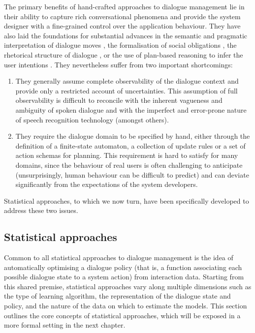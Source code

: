 The primary benefits of hand-crafted approaches to dialogue management lie in their ability to capture rich conversational phenomena and provide the system designer with a fine-grained control over the application behaviour.  They have also laid the foundations for substantial advances in the semantic and pragmatic interpretation of dialogue moves \citep{ThomasonManuscript-THOEUA,Ginzburg2012}, the formalisation of social obligations \citep{Traum:1994}, the rhetorical structure of dialogue \citep{0521659515}, or the use of plan-based reasoning to infer the user intentions \citep{Allen1980,Litman87}.  They nevertheless suffer from two important shortcomings: \begin{enumerate}
\item They generally assume complete observability of the dialogue context and provide only a restricted account of uncertainties. This assumption of full observability is difficult to reconcile with the inherent vagueness and ambiguity of spoken dialogue and with the imperfect and error-prone nature of speech recognition technology (amongst others).

\item They require the dialogue domain to be specified by hand, either through the definition of a finite-state automaton, a collection of update rules or a set of action schemas for planning.  This requirement is hard to satisfy for many domains, since the behaviour of real users is often challenging to anticipate (unsurprisingly, human behaviour can be difficult to predict) and can deviate significantly from the expectations of the system developers. 
\end{enumerate}

Statistical approaches, to which we now turn, have been specifically developed to address these two issues.

\subsection{Statistical approaches}
\label{sec:statistical}

Common to all statistical approaches to dialogue management is the idea of automatically optimising a dialogue policy (that is, a function associating each possible dialogue state to a system action) from interaction data.  Starting from this shared premise, statistical approaches vary along multiple dimensions such as the type of learning algorithm, the representation of the dialogue state and policy, and the nature of the data on which to estimate the models. This section outlines the core concepts of statistical approaches, which will be exposed in a more formal setting in the next chapter. 

